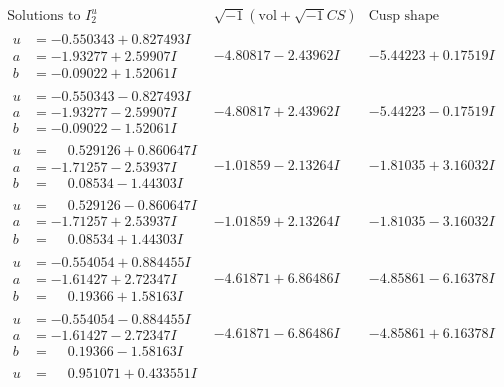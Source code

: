 \documentclass[1p]{elsarticle_modified}
\theoremstyle{definition}
\newcommand{\I}{\sqrt{-1}}
\begin{document}
$$\begin{array}{c|c|c}  
\text{Solutions to }I^u_{2}& \I (\text{vol} + \sqrt{-1}CS) & \text{Cusp shape}\\
 \hline 
\begin{aligned}
u &= -0.550343 + 0.827493 I \\
a &= -1.93277 + 2.59907 I \\
b &= -0.09022 + 1.52061 I\end{aligned}
 & -4.80817 - 2.43962 I & -5.44223 + 0.17519 I \\ \hline\begin{aligned}
u &= -0.550343 - 0.827493 I \\
a &= -1.93277 - 2.59907 I \\
b &= -0.09022 - 1.52061 I\end{aligned}
 & -4.80817 + 2.43962 I & -5.44223 - 0.17519 I \\ \hline\begin{aligned}
u &= \phantom{-}0.529126 + 0.860647 I \\
a &= -1.71257 - 2.53937 I \\
b &= \phantom{-}0.08534 - 1.44303 I\end{aligned}
 & -1.01859 - 2.13264 I & -1.81035 + 3.16032 I \\ \hline\begin{aligned}
u &= \phantom{-}0.529126 - 0.860647 I \\
a &= -1.71257 + 2.53937 I \\
b &= \phantom{-}0.08534 + 1.44303 I\end{aligned}
 & -1.01859 + 2.13264 I & -1.81035 - 3.16032 I \\ \hline\begin{aligned}
u &= -0.554054 + 0.884455 I \\
a &= -1.61427 + 2.72347 I \\
b &= \phantom{-}0.19366 + 1.58163 I\end{aligned}
 & -4.61871 + 6.86486 I & -4.85861 - 6.16378 I \\ \hline\begin{aligned}
u &= -0.554054 - 0.884455 I \\
a &= -1.61427 - 2.72347 I \\
b &= \phantom{-}0.19366 - 1.58163 I\end{aligned}
 & -4.61871 - 6.86486 I & -4.85861 + 6.16378 I \\ \hline\begin{aligned}
u &= \phantom{-}0.951071 + 0.433551 I \\

\end{aligned}
\end{array}$$
\end{document}
